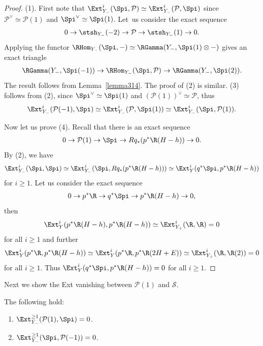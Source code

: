 \begin{proof}
(1).
First note that $\Ext_{Y_-}^{i}(\Spi, \mathcal{P}) \simeq \Ext_{Y_-}^{i}(\mathcal{P}, \Spi)$ since
$\mathcal{P}^{\vee} \simeq \mathcal{P}(1)$ and $\Spi^{\vee} \simeq \Spi(1)$.
Let~us consider the exact sequence
\begin{gather*}
0 \to \stsh_{Y_-}(-2) \to \mathcal{P} \to \stsh_{Y_-}(1) \to 0.
\end{gather*}
Applying the functor $\RHom_{Y_-}(\Spi,-) \simeq \RGamma(Y_-, \Spi(1) \otimes -)$ gives an exact triangle
\begin{gather*}
\RGamma(Y_-, \Spi(-1)) \to \RHom_{Y_-}(\Spi, \mathcal{P}) \to \RGamma(Y_-, \Spi(2)).
\end{gather*}
The result follows from Lemma~\ref{lemma314}.
The proof of (2) is similar.
(3) follows from (2),
since $\Spi^{\vee} \simeq \Spi(1)$ and $(\mathcal{P}(1))^{\vee} \simeq \mathcal{P}$, thus
\begin{gather*}
\Ext_{Y_-}^i(\mathcal{P}(-1), \Spi) \simeq \Ext_{Y_-}^i(\mathcal{P}, \Spi(1)) \simeq \Ext^i_{Y_-}(\Spi, \mathcal{P}(1)).
\end{gather*}

Now let us prove (4).
Recall that there is an exact sequence
\begin{gather*}
0 \to \mathcal{P}(1) \to \Spi \to Rq_*(p^*\R(H-h)) \to 0.
\end{gather*}
By (2), we have
\begin{gather*}
\Ext_{Y_-}^i(\Spi, \Spi) \simeq \Ext_{Y_-}^i(\Spi, Rq_*(p^*\R(H-h))) \simeq \Ext_{Y}^i(q^*\Spi, p^*\R(H-h))
\end{gather*}
for $i \geq 1$.
Let us consider the exact sequence
\begin{gather*}
0 \to p^*\R \to q^*\Spi \to p^*\R(H-h) \to 0,
\end{gather*}
then
\begin{gather*}
\Ext_{Y}^i(p^*\R(H-h), p^*\R(H-h)) \simeq \Ext_{Y_+}^i(\R, \R) = 0
\end{gather*}
for all $ i \geq 1$ and further
\begin{gather*}
\Ext_{Y}^i(p^*\R, p^*\R(H-h)) \simeq \Ext_{Y}^i(p^*\R, p^*\R(2H+E)) \simeq \Ext_{Y_+}^i(\R, \R(2)) = 0
\end{gather*}
for all $i \geq 1$.
Thus $\Ext_{Y}^i(q^*\Spi, p^*\R(H-h)) = 0$ for all $i \geq 1$.
\end{proof}

Next we show the Ext vanishing between $\mathcal{P}(1)$ and $\mathcal{S}$.

\begin{Lemma}
The following hold:
\begin{enumerate}\itemsep=0pt
\item[$1.$] $\Ext_{Y_-}^{\geq 1}(\mathcal{P}(1), \Spi) = 0$.
\item[$2.$] $\Ext_{Y_-}^{\geq 1}(\Spi, \mathcal{P}(-1)) = 0$.
\end{enumerate}
\end{Lemma}

